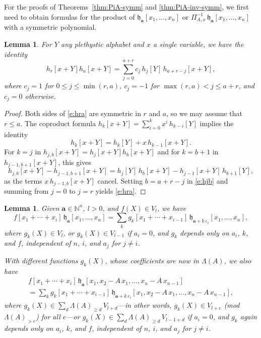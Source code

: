 \documentclass[12pt]{amsart}
\newtheorem{lemma}[thm]{Lemma}
\theoremstyle{definition}
\theoremstyle{remark}
\newcommand{\NN}{{\mathbb N}}
\newcommand{\aA}{{\mathbf a}}
\newcommand{\fh}{{\mathfrak h}}
\begin{document}
For the proofs of Theorems~\ref{thm:PiA-symm} and \ref{thm:PiA-inv-symm}, we first need
to obtain formulas for the product of $\fh_{\aA }[x_{1},\ldots,x_{n}]$ or $\Pi
_{A,x}^{-1}\, \fh_{\aA }[x_{1},\ldots,x_{n}]$ with a symmetric
polynomial.

\begin{lemma}\label{lem:hra}
For $Y$ any plethystic alphabet and $x$ a single variable, we have the
identity
\begin{equation}\label{e:hra}
h_r[x+Y] h_a[x+Y] = \sum _{j=0}^{a+r} c_{j}\, h_{j}[Y]\, h_{a+r-j}[x+Y],
\end{equation}
where $c_{j} = 1$ for $0\leq j\leq \min (r,a)$, $c_{j} = -1$ for $\max
(r,a)< j \leq a+r$, and $c_{j} = 0$ otherwise.
\end{lemma}

\begin{proof}
Both sides of \eqref{e:hra} are symmetric in $r$ and $a$, so we may
assume that $r \leq a$.  The coproduct formula $h_{k}[x+Y]= \sum
_{i=0}^{k} x^{i} \, h_{k-i}[Y]$ implies the identity
\begin{equation}\label{e:hk}
h_{k}[x+Y] = h_{k}[Y] + x\, h_{k-1}[x+Y].
\end{equation}
For $k=j$ in $h_{j,b}[x+Y] = h_j[x+Y] h_b[x+Y]$ and for $k=b+1$ in $h_{j-1,
b+1}[x+Y]$, this gives
\begin{equation}\label{e:hjb}
h_{j,b}[x+Y] - h_{j-1, b+1}[x+Y] = h_{j}[Y]\, h_{b}[x+Y] -
h_{j-1}[x+Y]\, h_{b+1}[Y],
\end{equation}
as the terms $x\, h_{j-1,b}[x+Y]$ cancel.  Setting $b=a+r-j$ in \eqref{e:hjb}
and summing from $j=0$ to $j=r$ yields \eqref{e:hra}.
\end{proof}

\begin{lemma}\label{lem:fha-recursive}
Given $\aA \in \NN ^{n}$, $l>0$, and $f(X)\in V_{l}$, we have
\begin{equation}\label{e:fha-recursive}
f[x_{1}+\cdots +x_{i}] \, \fh_{\aA }[x_{1}, \ldots, x_{n}] = \sum _{k}
g_{k}[x_{1}+\cdots +x_{i-1}]\, \fh_{\aA +k\, \varepsilon _{i}}[x_{1},
\ldots, x_{n}],
\end{equation}
where $g_{k}(X)\in V_{l}$, or $g_{k}(X)\in V_{l-1}$ if $a_{i} = 0$,
and $g_{k}$ depends only on $a_{i}$, $k$, and $f$, independent of $n$,
$i$, and $a_{j}$ for $j\not =i$.

With different functions $g_{k}(X)$, whose coefficients are now in
$\Lambda (A)$, we also have
\begin{multline}\label{e:fha-A-recursive}
f[x_{1}+\cdots +x_{i}] \, \fh_{\aA }[x_{1}, x_{2} - A\, x_{1}, \ldots,
x_{n} - A\, x_{n-1}] \\
= \sum _{k} g_{k}[x_{1}+\cdots +x_{i-1}]\, \fh_{\aA +k\, \varepsilon
_{i}}[x_{1}, x_{2} - A\, x_{1}, \ldots,
x_{n} - A\, x_{n-1}],
\end{multline}
where $g_{k}(X)\in \sum _{d}\Lambda (A)_{\geq d}\, V_{l+d}$---in other
words, $g_{k}(X)\in V_{l+e}$ {\rm (mod $\Lambda (A)_{>e}$)} for all
$e$---or $g_{k}(X)\in \sum _{d}\Lambda (A)_{\geq d}\, V_{l-1+d}$ if
$a_{i} = 0$, and $g_{k}$ again depends only on $a_{i}$, $k$, and $f$,
independent of $n$, $i$, and $a_{j}$ for $j\not =i$.
\end{lemma}
\end{document}
